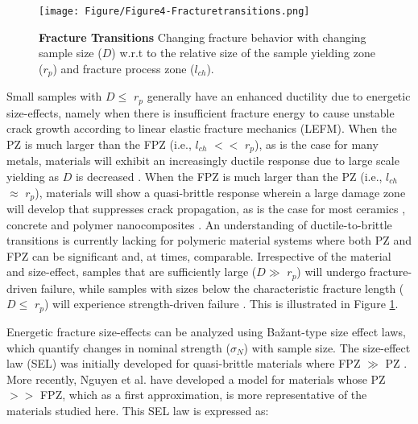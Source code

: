 \documentclass[11pt]{article}
\providecommand{\rp}[0]{$r_p$}
\providecommand{\lch}[0]{$l_{ch}$}
\begin{document}
        \begin{figure}[ht!]
            \centering
            \texttt{[image: Figure/Figure4-Fracturetransitions.png]}
            \caption{\textbf{Fracture Transitions} 
            Changing fracture behavior with changing sample size ($D$) w.r.t to the relative size of the sample yielding zone (\rp{}) and fracture process zone (\lch{}).}
            \label{fig:Figure4}
        \end{figure}
        
        Small samples with $D \leq$ \rp{} generally have an enhanced ductility due to energetic size-effects, namely when there is insufficient fracture energy to cause unstable crack growth according to linear elastic fracture mechanics (LEFM).
        When the PZ is much larger than the FPZ (i.e., \lch{} $<<$ \rp{}), as is the case for many metals, materials will exhibit an increasingly ductile response due to large scale yielding as $D$ is decreased \cite{nguyen2021structural}.
        When the FPZ is much larger than the PZ (i.e., \lch{} $\approx$ \rp{}), materials will show a quasi-brittle response wherein a large damage zone will develop that suppresses crack propagation, as is the case for most ceramics \cite{bavzant1990size}, concrete \cite{bavzant1984size} and polymer nanocomposites \cite{mefford2017failure}.
        An understanding of ductile-to-brittle transitions is currently lacking for polymeric material systems where both PZ and FPZ can be significant and, at times, comparable.
        Irrespective of the material and size-effect, samples that are sufficiently large ($D \gg$ \rp{}) will undergo fracture-driven failure, while samples with sizes below the characteristic fracture length ($D \leq$ \rp{}) will experience strength-driven failure \cite{bavzant1984size, bavzant1990size, bavzant2000size, ba1990determination, ast2019review, qiao2019strength}.
        This is illustrated in Figure \ref{fig:Figure4}.
        
        Energetic fracture size-effects can be analyzed using Ba\v{z}ant-type size effect laws, which quantify changes in nominal strength ($\sigma_{N}$) with sample size.
        The size-effect law (SEL) was initially developed for quasi-brittle materials where FPZ $\gg$ PZ \cite{bavzant1984size}.
        More recently, Nguyen et al. \cite{nguyen2021structural} have developed a model for materials whose PZ $>>$ FPZ, which as a first approximation, is more representative of the materials studied here.
        This SEL law is expressed as:
        
\end{document}
